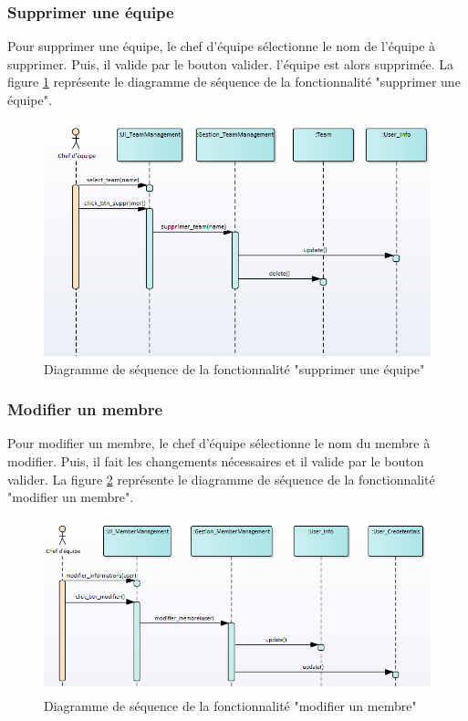 \subsubsection{Supprimer une équipe}
Pour supprimer une équipe, le chef d'équipe sélectionne le nom de l'équipe à supprimer. Puis, il valide par le bouton valider. l'équipe est alors supprimée.
La figure \ref{code71} représente le diagramme de séquence de la fonctionnalité "supprimer une équipe".
\begin{figure}[H]
  \centering
 \includegraphics[scale=0.69]{figures/diagrams/sequence/deleteteam_seq_diag.png}
 \caption{Diagramme de séquence de la fonctionnalité "supprimer une équipe"}
 \label{code71}
\end{figure}

\subsubsection{Modifier un membre}
Pour modifier un membre, le chef d'équipe sélectionne le nom du membre à modifier. Puis, il fait les changements nécessaires et il valide par le bouton valider.
La figure \ref{code72} représente le diagramme de séquence de la fonctionnalité "modifier un membre".
\begin{figure}[H]
  \centering
 \includegraphics[scale=0.65]{figures/diagrams/sequence/updatemember_seq_diag.png}
 \caption{Diagramme de séquence de la fonctionnalité "modifier un membre"}
 \label{code72}
\end{figure}

